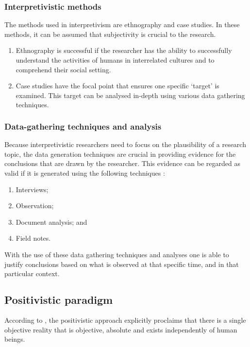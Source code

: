 \subsubsection{Interpretivistic methods}
The methods used in interpretivism are ethnography and case studies. In these methods, it can be assumed that subjectivity is crucial to the research. 
\begin{enumerate}[label=\roman*.]
	\item Ethnography is successful if the researcher has the ability to successfully understand the activities of humans in interrelated cultures and to comprehend their social setting.
	\item Case studies have the focal point that ensures one specific ‘target’ is examined. This target can be analysed in-depth using various data gathering techniques.
\end{enumerate}

\subsubsection{Data-gathering techniques and analysis}
Because interpretivistic researchers need to focus on the plausibility of a research topic, the data generation techniques are crucial in providing evidence for the conclusions that are drawn by the researcher. This evidence can be regarded as valid if it is generated using the following techniques \citep{OatesJ2006}:
\begin{enumerate}[label=\roman*.]
	\item Interviews;
	\item Observation;
	\item Document analysis; and
	\item Field notes.
\end{enumerate}

With the use of these data gathering techniques and analyses one is able to justify conclusions based on what is observed at that specific time, and in that particular context.

\subsection{Positivistic paradigm}
According to \cite{DeVilliers2005}, the positivistic approach explicitly proclaims that there is a single objective reality that is objective, absolute and exists independently of human beings. 

